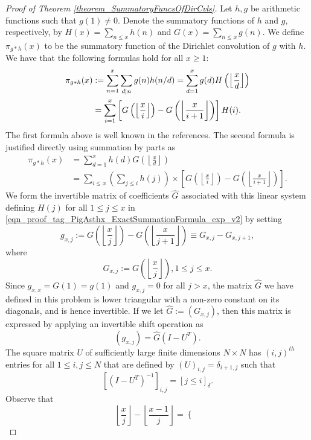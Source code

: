 \documentclass[11pt,reqno,a4letter]{article}
\numberwithin{figure}{section}
\numberwithin{table}{section}
\newcommand{\Iverson}[1]{\ensuremath{\left[#1\right]_{\delta}}}
\newcommand{\floor}[1]{\left\lfloor #1 \right\rfloor}
\newcommand{\Floor}[2]{\ensuremath{\left\lfloor \frac{#1}{#2} \right\rfloor}}
\theoremstyle{plain}
\numberwithin{theorem}{section}
\theoremstyle{definition}
\begin{document}
\begin{proof}[Proof of Theorem \ref{theorem_SummatoryFuncsOfDirCvls}] 
\label{proofOf_theorem_SummatoryFuncsOfDirCvls} 
Let $h,g$ be arithmetic functions such that $g(1) \neq 0$. 
Denote the summatory functions of $h$ and $g$, 
respectively, by $H(x) = \sum_{n \leq x} h(n)$ and $G(x) = \sum_{n \leq x} g(n)$. 
We define $\pi_{g \ast h}(x)$ to be the summatory function of the 
Dirichlet convolution of $g$ with $h$. 
We have that the following formulas hold for all $x \geq 1$: 
\begin{align} 
\notag 
\pi_{g \ast h}(x) & := \sum_{n=1}^{x} \sum_{d|n} g(n) h(n/d) = \sum_{d=1}^x g(d) H\left(\floor{\frac{x}{d}}\right) \\ 
\label{eqn_proof_tag_PigAsthx_ExactSummationFormula_exp_v2} 
     & = \sum_{i=1}^x \left[G\left(\floor{\frac{x}{i}}\right) - G\left(\floor{\frac{x}{i+1}}\right)\right] H(i). 
\end{align} 
The first formula above is well known in the references. The second formula is justified directly using 
summation by parts as \cite[\S 2.10(ii)]{NISTHB} 
\begin{align*} 
\pi_{g \ast h}(x) & = \sum_{d=1}^x h(d) G\left(\floor{\frac{x}{d}}\right) \\ 
     & = \sum_{i \leq x} \left(\sum_{j \leq i} h(j)\right) \times 
     \left[G\left(\floor{\frac{x}{i}}\right) - 
     G\left(\floor{\frac{x}{i+1}}\right)\right]. 
\end{align*} 
We form the invertible matrix of coefficients $\widehat{G}$ 
associated with this linear system defining $H(j)$ for all 
$1 \leq j \leq x$ in \eqref{eqn_proof_tag_PigAsthx_ExactSummationFormula_exp_v2} by setting 
\[
g_{x,j} := G\left(\floor{\frac{x}{j}}\right) - G\left(\floor{\frac{x}{j+1}}\right) \equiv G_{x,j} - G_{x,j+1}, 
\] 
where 
\[
G_{x,j} := G\left(\Floor{x}{j}\right), 1 \leq j \leq x. 
\]
Since $g_{x,x} = G(1) = g(1)$ and $g_{x,j} = 0$ for all $j > x$, 
the matrix $\widehat{G}$ we have defined in this problem is lower triangular with a non-zero 
constant on its diagonals, and is hence invertible. 
If we let $\hat{G} := (G_{x,j})$, then this matrix is 
expressed by applying an invertible shift operation as 
\[
(g_{x,j}) = \hat{G} (I - U^{T}). 
\]
The square matrix $U$ of sufficiently large finite dimensions $N \times N$ 
has $(i,j)^{th}$ entries for all $1 \leq i,j \leq N$ that are defined by 
$(U)_{i,j} = \delta_{i+1,j}$ such that 
\[
\left[(I - U^T)^{-1}\right]_{i,j} = \Iverson{j \leq i}. 
\]
Observe that 
\[
\Floor{x}{j} - \Floor{x-1}{j} = \begin{cases} 

\end{cases}\]
\end{proof}
\end{document}
